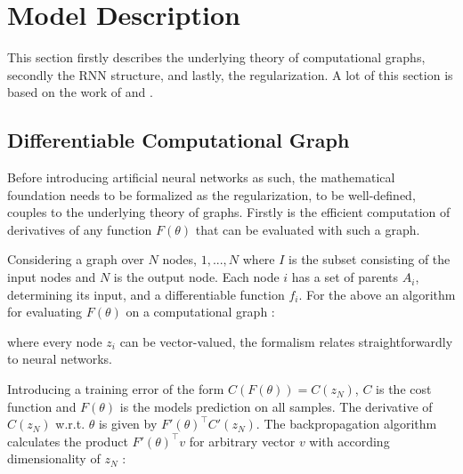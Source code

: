 \chapter{Model Description}

This section firstly describes the underlying theory of computational graphs, secondly the RNN structure, and lastly, the regularization. A lot of this section is based on the work of \textcite{suts} and \textcite{Martens2012}.

\section{Differentiable Computational Graph}

Before introducing artificial neural networks as such, the mathematical foundation needs to be formalized as the regularization, to be well-defined, couples to the underlying theory of graphs. Firstly is the efficient computation of derivatives of any function $F(\theta)$ that can be evaluated with such a graph. 

Considering a graph over $N$ nodes, $1, ..., N$ where $I$ is the subset consisting of the input nodes and $N$ is the output node. Each node $i$ has a set of parents $A_i$, determining its input, and a differentiable function $f_i$. For the above an algorithm for evaluating $F(\theta)$ on a computational graph \cite{suts}:

\begin{algorithmic}[1]
    \EndFor
\end{algorithmic}

where every node $z_i$ can be vector-valued, the formalism relates straightforwardly to neural networks.

Introducing a training error of the form $C(F(\theta)) = C(z_N)$, $C$ is the cost function and $F(\theta)$ is the models prediction on all samples. The derivative of $C(z_N)$ w.r.t. $\theta$ is given by $F'(\theta)^\top C'(z_N)$. The backpropagation algorithm calculates the product $F'(\theta)^\top v$ for arbitrary vector $v$ with according dimensionality of $z_N$ \cite{suts}:

\begin{algorithmic}[1]
    \EndFor
    \EndFor
\end{algorithmic}

